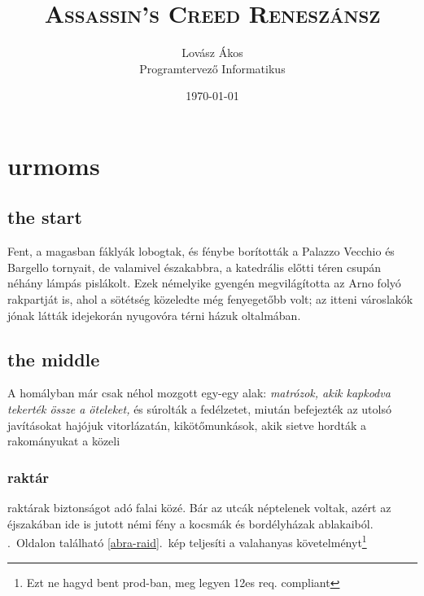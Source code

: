 \documentclass[12pt,a4paper,twoside]{report}
\theoremstyle{definition}
\begin{document}
\pagestyle{fancy}
\fancyhf{}
\fancyhead[EL]{\thepage}
\fancyhead[ER]{\nouppercase{\small\sffamily\leftmark}}
\fancyhead[OR]{\thepage}
\fancyhead[OL]{\nouppercase{\small\sffamily\rightmark}}

\title{\textsc{Assassin's Creed Reneszánsz}}
	\author{Lovász Ákos\\Programtervező Informatikus}
	\date{\today}
	\maketitle
	\tableofcontents

\chapter{urmoms}
\section{the start}
Fent, a magasban fáklyák lobogtak, és fénybe borították a Palazzo Vecchio és Bargello tornyait, de valamivel északabbra, a katedrális előtti téren csupán néhány lámpás pislákolt. Ezek némelyike gyengén megvilágította az Arno folyó rakpartját is, ahol a sötétség közeledte még fenyegetőbb volt; az itteni városlakók jónak látták idejekorán nyugovóra  térni  házuk  oltalmában. 
\section{the middle}
A homályban  már  csak  néhol mozgott  egy-egy  alak:  \emph{matrózok,  akik  kapkodva  tekerték  össze  a öteleket,}  és  súrolták  a  fedélzetet,  miután  befejezték  az  utolsó javításokat hajójuk vitorlázatán, kikötőmunkások, akik sietve hordták a rakományukat a közeli 
\subsection{raktár}
raktárak biztonságot adó falai közé. Bár az utcák néptelenek voltak, azért az éjszakában ide is jutott némi fény a kocsmák és bordélyházak ablakaiból.
\Az{\pageref{abra-raid}}.~Oldalon található \ref{abra-raid}.~kép teljesíti a valahanyas követelményt\footnote{Ezt ne hagyd bent prod-ban, meg legyen 12es req. compliant}
\end{document}
